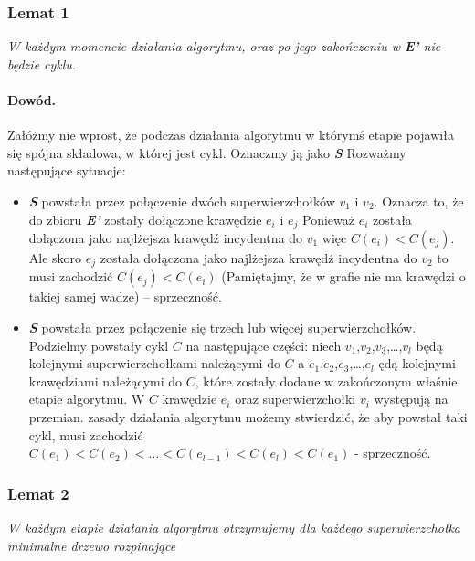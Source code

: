 \documentclass[12pt]{article}
\begin{document}
\subsubsection*{Lemat 1}
\textit {W każdym momencie działania algorytmu, oraz po jego zakończeniu w \textbf{E'} nie będzie cyklu.}
\paragraph*{Dowód.} 

Załóżmy nie wprost, że podczas działania algorytmu w którymś etapie pojawiła się spójna składowa, w której jest cykl. Oznaczmy ją jako \textit{\textbf{S}} Rozważmy następujące sytuacje:
\begin{itemize}
	\item \textit{\textbf{S}} powstała przez połączenie dwóch superwierzchołków ${v_1}$ i ${v_2}$. Oznacza to, że do zbioru \textit{\textbf{E'}} zostały dołączone krawędzie ${e_i}$ i ${e_j}$ Ponieważ ${e_i}$ została dołączona jako najlżejsza krawędź incydentna do ${v_1}$ więc  $C(e_{i})<C(e_{j})$. Ale skoro ${e_j}$ została dołączona jako najlżejsza krawędź incydentna do ${v_2}$ to musi zachodzić $C(e_{j})<C(e_{i})$ (Pamiętajmy, że w grafie nie ma krawędzi o takiej samej wadze) – sprzeczność.
	\item \textit{\textbf{S}} powstała przez połączenie się trzech lub więcej superwierzchołków. Podzielmy powstały cykl $C$ na następujące części: niech ${v_1}$,${v_2}$,${v_3}$,\dots,${v_l}$ będą kolejnymi superwierzchołkami należącymi do $C$ a ${e_1}$,${e_2}$,${e_3}$,\dots,${e_l}$ ędą kolejnymi krawędziami należącymi do $C$, które zostały dodane w zakończonym właśnie etapie algorytmu. W $C$ krawędzie ${e_i}$ oraz superwierzchołki ${v_i}$ występują na przemian.  zasady działania algorytmu możemy stwierdzić, że aby powstał taki cykl, musi zachodzić $C(e_{1})<C(e_{2})<\dots<C(e_{l-1})<C(e_{l})<C(e_{1})$ - sprzeczność. 
\end{itemize}

\subsubsection*{Lemat 2}
\textit {W każdym etapie działania algorytmu otrzymujemy dla każdego superwierzchołka minimalne drzewo rozpinające}
\end{document}
